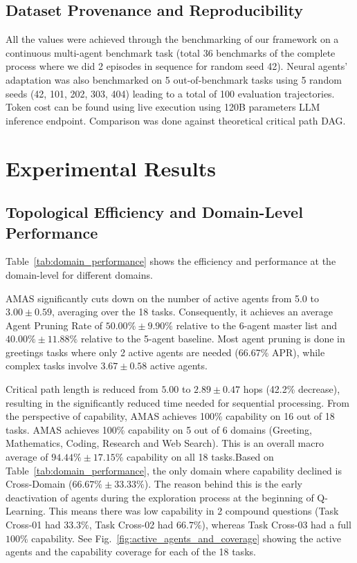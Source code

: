 \documentclass[conference]{IEEEtran}
\begin{document}
\subsection{Dataset Provenance and Reproducibility}
All the values were achieved through the benchmarking of our framework on a continuous multi-agent benchmark task (total 36 benchmarks of the complete process where we did 2 episodes in sequence for random seed 42). Neural agents’ adaptation was also benchmarked on 5 out-of-benchmark tasks using 5 random seeds (42, 101, 202, 303, 404) leading to a total of 100 evaluation trajectories. Token cost can be found using live execution using 120B parameters LLM inference endpoint. Comparison was done against theoretical critical path DAG.

\section{Experimental Results}

\label{sec:experimental_results}

\subsection{Topological Efficiency and Domain-Level Performance}

Table~\ref{tab:domain_performance} shows the efficiency and performance at the domain-level for different domains.



AMAS significantly cuts down on the number of active agents from 5.0 to $3.00 \pm 0.59$, averaging over the 18 tasks. Consequently, it achieves an average Agent Pruning Rate of $\mathbf{50.00\% \pm 9.90\%}$ relative to the 6-agent master list and $\mathbf{40.00\% \pm 11.88\%}$ relative to the 5-agent baseline. Most agent pruning is done in greetings tasks where only 2 active agents are needed (66.67\% APR), while complex tasks involve $3.67 \pm 0.58$ active agents.

Critical path length is reduced from $5.00$ to $\mathbf{2.89 \pm 0.47}$ hops (42.2\% decrease), resulting in the significantly reduced time needed for sequential processing. From the perspective of capability, AMAS achieves 100\% capability on 16 out of 18 tasks. AMAS achieves 100\% capability on 5 out of 6 domains (Greeting, Mathematics, Coding, Research and Web Search). This is an overall macro average of $94.44\% \pm 17.15\%$ capability on all 18 tasks.Based on Table~\ref{tab:domain_performance}, the only domain where capability declined is Cross-Domain ($66.67\% \pm 33.33\%$). The reason behind this is the early deactivation of agents during the exploration process at the beginning of Q-Learning. This means there was low capability in 2 compound questions (Task Cross-01 had $33.3\%$, Task Cross-02 had $66.7\%$), whereas Task Cross-03 had a full $100\%$ capability. See Fig.~\ref{fig:active_agents_and_coverage} showing the active agents and the capability coverage for each of the 18 tasks.
\end{document}
